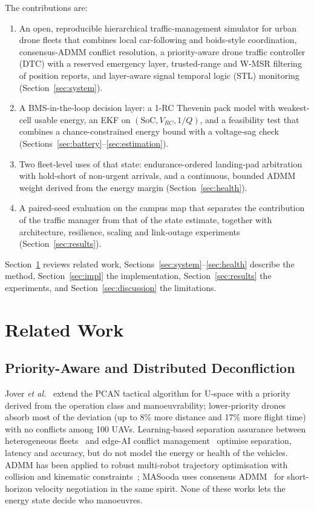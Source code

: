 \documentclass[journal]{IEEEtran}
\begin{document}
The contributions are:
\begin{enumerate}
\item An open, reproducible hierarchical traffic-management simulator for urban drone fleets that combines local car-following and boids-style coordination, consensus-ADMM conflict resolution, a priority-aware drone traffic controller (DTC) with a reserved emergency layer, trusted-range and W-MSR filtering of position reports, and layer-aware signal temporal logic (STL) monitoring (Section~\ref{sec:system}).
\item A BMS-in-the-loop decision layer: a 1-RC Thevenin pack model with weakest-cell usable energy, an EKF on $(\mathrm{SoC}, V_{RC}, 1/Q)$, and a feasibility test that combines a chance-constrained energy bound with a voltage-sag check (Sections~\ref{sec:battery}--\ref{sec:estimation}).
\item Two fleet-level uses of that state: endurance-ordered landing-pad arbitration with hold-short of non-urgent arrivals, and a continuous, bounded ADMM weight derived from the energy margin (Section~\ref{sec:health}).
\item A paired-seed evaluation on the campus map that separates the contribution of the traffic manager from that of the state estimate, together with architecture, resilience, scaling and link-outage experiments (Section~\ref{sec:results}).
\end{enumerate}

Section~\ref{sec:related} reviews related work, Sections~\ref{sec:system}--\ref{sec:health} describe the method, Section~\ref{sec:impl} the implementation, Section~\ref{sec:results} the experiments, and Section~\ref{sec:discussion} the limitations.

\section{Related Work}\label{sec:related}

\subsection{Priority-Aware and Distributed Deconfliction}
Jover \textit{et al.}~\cite{jover2022priority} extend the PCAN tactical algorithm for U-space with a priority derived from the operation class and manoeuvrability; lower-priority drones absorb most of the deviation (up to 8\% more distance and 17\% more flight time) with no conflicts among 100 UAVs. Learning-based separation assurance between heterogeneous fleets~\cite{sharifi2026separation} and edge-AI conflict management~\cite{agnihotri2025swarm} optimise separation, latency and accuracy, but do not model the energy or health of the vehicles. ADMM has been applied to robust multi-robot trajectory optimisation with collision and kinematic constraints~\cite{ni2022admm}; MASooda uses consensus ADMM~\cite{boyd2011admm} for short-horizon velocity negotiation in the same spirit. None of these works lets the energy state decide who manoeuvres.
\end{document}
